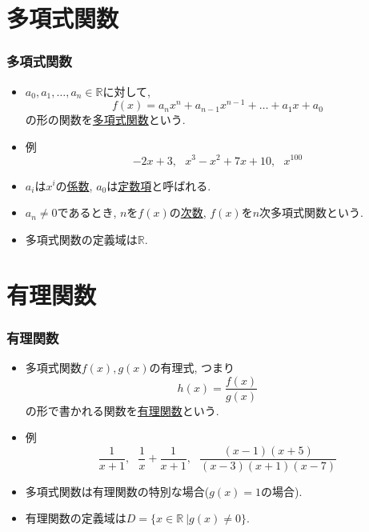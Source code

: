 \documentclass[dvipdfmx,cjk,10.2pt]{beamer}
\newcommand{\R}{\mathbb{R}}
\theoremstyle{definition}
\begin{document}

\section{多項式関数}


\begin{frame}
\frametitle{多項式関数}

\begin{itemize}
\item 
$a_0,a_1,\dots,a_n \in \R$に対して, 
$$
f(x)=a_nx^n+a_{n-1}x^{n-1}+\dots+a_1x+a_0
$$
の形の関数を\underline{多項式関数}という. 
\item 例
$$
-2x+3, \ \ \ x^3-x^2+7x+10, \ \ \ x^{100} 
$$
\item $a_i$は$x^i$の\underline{係数}, $a_0$は\underline{定数項}と呼ばれる. 
\item $a_n \neq 0$であるとき, $n$を$f(x)$の\underline{次数}, $f(x)$を$n$次多項式関数という. 
\item 多項式関数の定義域は$\R$. 
\end{itemize}

\end{frame}





\section{有理関数}

\begin{frame}
\frametitle{有理関数}

\begin{itemize}
\item 
多項式関数$f(x),g(x)$の有理式, つまり
$$
h(x)=\frac{f(x)}{g(x)}
$$
の形で書かれる関数を\underline{有理関数}という. 
\item 例
$$
\frac{1}{x+1}, \ \ \ \frac{1}{x}+\frac{1}{x+1}, \ \ \ \frac{(x-1)(x+5)}{(x-3)(x+1)(x-7)}
$$
\item 多項式関数は有理関数の特別な場合($g(x)=1$の場合). 
\item 有理関数の定義域は$D=\{ x \in \R \ | g(x) \neq 0\}$.
\end{itemize}

\end{frame}
\end{document}
